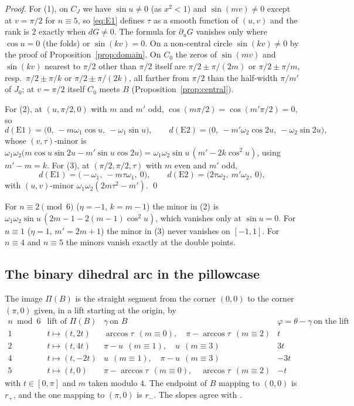 \begin{proof}
For (1), on $C_J$ we have $\sin u\neq0$ (as $x^2<1$) and $\sin(mv)\neq0$ except at $v=\pi/2$ for $n\equiv5$, so
\eqref{eq:E1} defines $\tau$ as a smooth function of $(u,v)$ and the rank is $2$ exactly when $dG\neq0$. The
formula for $\partial_uG$ vanishes only where $\cos u=0$ (the folds) or $\sin(kv)=0$. On a non-central circle
$\sin(kv)\neq0$ by the proof of Proposition~\ref{prop:domain}. On $C_0$ the zeros of $\sin(mv)$ and $\sin(kv)$ nearest
to $\pi/2$ other than $\pi/2$ itself are $\pi/2\pm\pi/(2m)$ or $\pi/2\pm\pi/m$, resp.\ $\pi/2\pm\pi/k$ or
$\pi/2\pm\pi/(2k)$, all farther from $\pi/2$ than the half-width $\pi/m'$ of $J_0$; at $v=\pi/2$ itself $C_0$ meets
$B$ (Proposition~\ref{prop:central}).

For (2), at $(u,\pi/2,0)$ with $m$ and $m'$ odd, $\cos(m\pi/2)=\cos(m'\pi/2)=0$, so
\[
d(\mathrm{E1})=\bigl(0,\ -m\omega_1\cos u,\ -\omega_1\sin u\bigr),\qquad
d(\mathrm{E2})=\bigl(0,\ -m'\omega_2\cos2u,\ -\omega_2\sin2u\bigr),
\]
whose $(v,\tau)$-minor is $\omega_1\omega_2\bigl(m\cos u\sin2u-m'\sin u\cos2u\bigr)=\omega_1\omega_2\sin u\,(m'-2k\cos^2u)$,
using $m'-m=k$. For (3), at $(\pi/2,\pi/2,\tau)$ with $m$ even and $m'$ odd,
\[
d(\mathrm{E1})=\bigl(-\omega_1,\ -m\tau\omega_1,\ 0\bigr),\qquad d(\mathrm{E2})=\bigl(2\tau\omega_2,\ m'\omega_2,\ 0\bigr),
\]
with $(u,v)$-minor $\omega_1\omega_2(2m\tau^2-m')$. \qed
\end{proof}

For $n\equiv2\pmod6$ ($\eta=-1$, $k=m-1$) the minor in (2) is $\omega_1\omega_2\sin u\,(2m-1-2(m-1)\cos^2u)$, which
vanishes only at $\sin u=0$. For $n\equiv1$ ($\eta=1$, $m'=2m+1$) the minor in (3) never vanishes on $[-1,1]$.
For $n\equiv4$ and $n\equiv5$ the minors vanish exactly at the double points.

\subsection{The binary dihedral arc in the pillowcase}\label{sec:binarydihedral}

\begin{proposition}\label{prop:Bimage}
The image $\Pi(B)$ is the straight segment from the corner $(0,0)$ to the corner $(\pi,0)$ given, in a lift
starting at the origin, by
\[
\begin{array}{c|c|c|c}
n\bmod6 & \text{lift of }\Pi(B) & \gamma\ \text{on }B & \varphi=\theta-\gamma\ \text{on the lift}\\ \hline
1 & t\mapsto(t,2t) & \arccos\tau\ \ (m\equiv0),\quad\pi-\arccos\tau\ \ (m\equiv2) & t\\
2 & t\mapsto(t,4t) & \pi-u\ \ (m\equiv1),\quad u\ \ (m\equiv3) & 3t\\
4 & t\mapsto(t,-2t) & u\ \ (m\equiv1),\quad\pi-u\ \ (m\equiv3) & -3t\\
5 & t\mapsto(t,0) & \pi-\arccos\tau\ \ (m\equiv0),\quad\arccos\tau\ \ (m\equiv2) & -t
\end{array}
\]
with $t\in[0,\pi]$ and $m$ taken modulo $4$. The endpoint of $B$ mapping to $(0,0)$ is $r_+$, and the one mapping
to $(\pi,0)$ is $r_-$. The slopes agree with \cite[Thm.~4.1]{FKP}.
\end{proposition}

